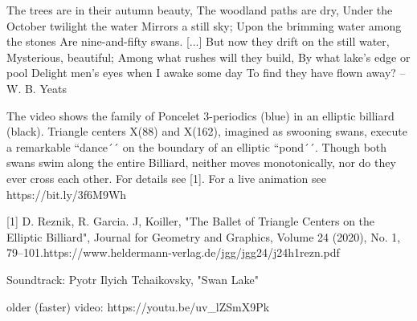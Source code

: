 The trees are in their autumn beauty,
The woodland paths are dry,
Under the October twilight the water
Mirrors a still sky;
Upon the brimming water among the stones
Are nine-and-fifty swans.
[...]
But now they drift on the still water,
Mysterious, beautiful;
Among what rushes will they build,
By what lake's edge or pool
Delight men's eyes when I awake some day
To find they have flown away? --W. B. Yeats

The video shows the family of Poncelet 3-periodics (blue) in an elliptic billiard (black). Triangle centers X(88) and X(162), imagined as swooning swans, execute a remarkable ``dance´´ on the boundary of an elliptic ``pond´´. Though both swans swim along the entire Billiard, neither moves monotonically, nor do they ever cross each other. For details see [1]. For a live animation see https://bit.ly/3f6M9Wh

[1] D. Reznik,  R. Garcia. J, Koiller, "The Ballet of Triangle Centers
on the Elliptic Billiard", Journal for Geometry and Graphics, Volume 24 (2020), No. 1, 79–101. ​https://www.heldermann-verlag.de/jgg/jgg24/j24h1rezn.pdf

Soundtrack: Pyotr Ilyich Tchaikovsky, "Swan Lake"

older (faster) video: https://youtu.be/uv_lZSmX9Pk